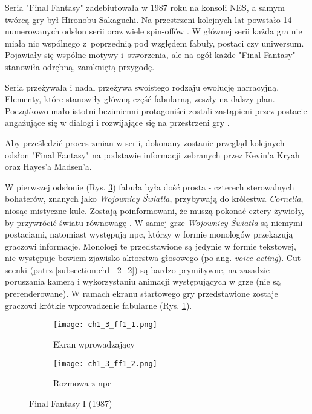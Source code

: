 Seria "Final Fantasy" zadebiutowała w 1987 roku na konsoli NES, a samym twórcą gry był Hironobu
Sakaguchi. Na przestrzeni kolejnych lat powstało 14 numerowanych odsłon serii oraz wiele spin-offów
\cite{the_evolution_of_final_fantasy}. W głównej serii każda gra nie miała nic wspólnego z~poprzednią
pod względem fabuły, postaci czy uniwersum. Pojawiały się wspólne motywy i~stworzenia, ale na ogół
każde "Final Fantasy" stanowiła odrębną, zamkniętą przygodę\cite{the_evolution_of_final_fantasy}.

Seria przeżywała i nadal przeżywa swoistego rodzaju ewolucję narracyjną. Elementy, które stanowiły
główną część fabularną, zeszły na dalszy plan. Początkowo mało istotni bezimienni protagoniści zostali
zastąpieni przez postacie angażujące się w dialogi i rozwijające się na przestrzeni gry
\cite{the_evolution_of_final_fantasy}.

Aby prześledzić proces zmian w serii, dokonany zostanie przegląd kolejnych odsłon "Final Fantasy" na
podstawie informacji zebranych przez Kevin'a Kryah\cite{the_evolution_of_final_fantasy} oraz
Hayes'a Madsen'a\cite{25_years_later}.

W pierwszej odsłonie (Rys. \ref{fig:ch1_3_ff1}) fabuła była dość prosta - czterech sterowalnych
bohaterów, znanych jako \textit{Wojownicy Światła}, przybywają do królestwa \textit{Cornelia}, niosąc
mistyczne kule. Zostają poinformowani, że muszą pokonać cztery żywioły, by przywrócić światu równowagę
\cite{the_evolution_of_final_fantasy}. W samej grze \textit{Wojownicy Światła} są niemymi postaciami,
natomiast występują \gls{npc}, którzy w formie monologów przekazują
graczowi informacje. Monologi te przedstawione są jedynie w formie tekstowej, nie występuje bowiem
zjawisko aktorstwa głosowego (po ang. \textit{voice acting}). Cut-scenki (patrz \ref{subsection:ch1_2_2})
są bardzo prymitywne, na zasadzie poruszania kamerą i wykorzystaniu animacji występujących w grze
(nie są prerenderowane). W ramach ekranu startowego gry przedstawione zostaje graczowi krótkie
wprowadzenie fabularne (Rys. \ref{subfig:ch_1_3_ff1}).

\begin{figure}[h]
    \begin{subfigure}{0.49\textwidth}
        \caption{Ekran wprowadzający}
        \texttt{[image: ch1\_3\_ff1\_1.png]}
        \label{subfig:ch_1_3_ff1}
    \end{subfigure}
    \begin{subfigure}{0.49\textwidth}
        \caption{Rozmowa z \gls{npc}}
        \texttt{[image: ch1\_3\_ff1\_2.png]}
        \label{subfig:ch_1_3_ff1_2}
    \end{subfigure}
    \caption{Final Fantasy I (1987)}
    \label{fig:ch1_3_ff1}
\end{figure}

